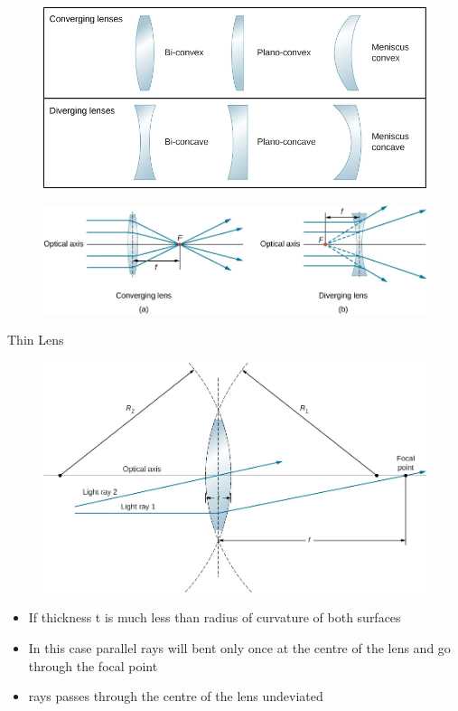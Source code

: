 \documentclass{beamer}
\begin{document}
\begin{frame}
	\begin{figure}[h]
		\includegraphics[scale=0.3]{55.png} 
	\end{figure}
	\begin{figure}
		\includegraphics[scale=0.3]{56.png}
	\end{figure}
\end{frame}

\begin{frame}{Thin Lens}
	\begin{figure}
		\includegraphics[scale=0.2]{57.png}
	\end{figure}
	\begin{itemize}
		\item If thickness t is much less than radius of curvature of both surfaces
		\item In this case parallel rays will bent only once at the centre of the lens and go through the focal point
		\item rays passes through the centre of the lens undeviated 
	\end{itemize}
\end{frame}
\end{document}
